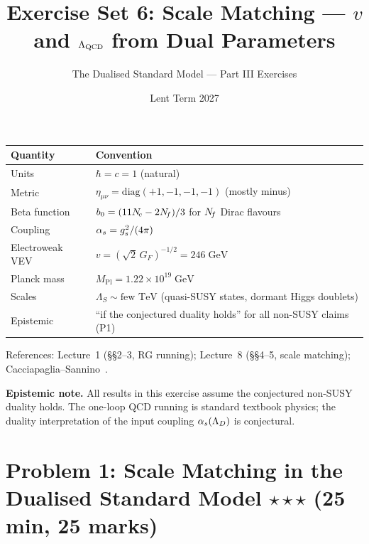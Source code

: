 \documentclass[11pt,a4paper]{article}
\title{\textbf{Exercise Set 6: Scale Matching --- $v$ and $\Lambda_{\mathrm{QCD}}$
  from Dual Parameters}}
\author{The Dualised Standard Model --- Part III Exercises}
\date{Lent Term 2027}
\begin{document}
\maketitle

\begin{conventionbox}[title={Conventions for these exercises}]
\renewcommand{\arraystretch}{1.3}
\begin{tabular}{@{}l l@{}}
\toprule
\textbf{Quantity} & \textbf{Convention} \\
\midrule
Units & $\hbar = c = 1$ (natural) \\
Metric & $\eta_{\mu\nu} = \mathrm{diag}(+1,-1,-1,-1)$ (mostly minus) \\
Beta function & $b_0 = (11N_{\!c} - 2N_{\!f})/3$ for $N_{\!f}$ Dirac flavours \\
Coupling & $\alpha_s = g_s^2/(4\pi)$ \\
Electroweak VEV & $v = (\sqrt{2}\,G_F)^{-1/2} = 246\;\text{GeV}$ \\
Planck mass & $M_{\text{Pl}} = 1.22 \times 10^{19}\;\text{GeV}$ \\
Scales & $\Lambda_S \sim \text{few TeV}$ (quasi-SUSY states, dormant
  Higgs doublets) \\
Epistemic & ``if the conjectured duality holds'' for all non-SUSY claims (P1) \\
\bottomrule
\end{tabular}

\medskip

\noindent References: Lecture~1 (\S\S2--3, RG running);
Lecture~8 (\S\S4--5, scale matching);
Cacciapaglia--Sannino~\cite{CacciapagliaSannino2024}.

\medskip

\noindent\textbf{Epistemic note.}
All results in this exercise assume the conjectured non-SUSY
duality holds.  The one-loop QCD running is standard textbook
physics; the duality interpretation of the input coupling
$\alpha_s(\Lambda_D)$ is conjectural.
\end{conventionbox}

\bigskip


\section*{Problem 1: Scale Matching in the Dualised Standard Model
  \hfill $\star\star\star$ \normalsize(25 min, 25 marks)}
\label{prob:scale-matching}
\end{document}
